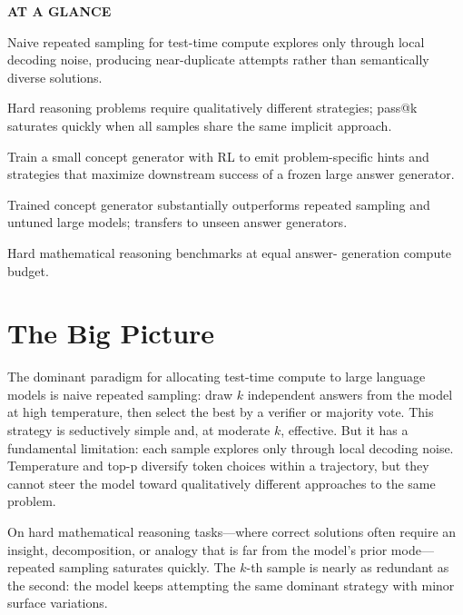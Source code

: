 \documentclass[10pt,twocolumn]{article}
\begin{document}
\begin{mdframed}[backgroundcolor=boxgray,linecolor=rulered,linewidth=1pt,
    innerleftmargin=6pt,innerrightmargin=6pt,
    innertopmargin=6pt,innerbottommargin=6pt]
\textbf{\small AT A GLANCE}\par\vspace{4pt}
\begin{description}[leftmargin=0pt,labelsep=4pt,itemsep=2pt,parsep=0pt,
    font=\small\bfseries]
  \item[Problem:] Naive repeated sampling for test-time compute explores only
    through local decoding noise, producing near-duplicate attempts rather
    than semantically diverse solutions.
  \item[Why it matters:] Hard reasoning problems require qualitatively
    different strategies; pass@k saturates quickly when all samples share the
    same implicit approach.
  \item[Method:] Train a small concept generator with RL to emit problem-specific
    hints and strategies that maximize downstream success of a frozen large
    answer generator.
  \item[Result:] Trained concept generator substantially outperforms repeated
    sampling and untuned large models; transfers to unseen answer generators.
  \item[Evidence:] Hard mathematical reasoning benchmarks at equal answer-
    generation compute budget.
\end{description}
\end{mdframed}

\section{The Big Picture}

The dominant paradigm for allocating test-time compute to large language models
is naive repeated sampling: draw $k$ independent answers from the model at
high temperature, then select the best by a verifier or majority vote. This
strategy is seductively simple and, at moderate $k$, effective. But it has a
fundamental limitation: each sample explores only through local decoding
noise. Temperature and top-p diversify token choices within a trajectory,
but they cannot steer the model toward qualitatively different approaches to
the same problem.

On hard mathematical reasoning tasks---where correct solutions often require
an insight, decomposition, or analogy that is far from the model's prior
mode---repeated sampling saturates quickly. The $k$-th sample is nearly as
redundant as the second: the model keeps attempting the same dominant
strategy with minor surface variations.
\end{document}
